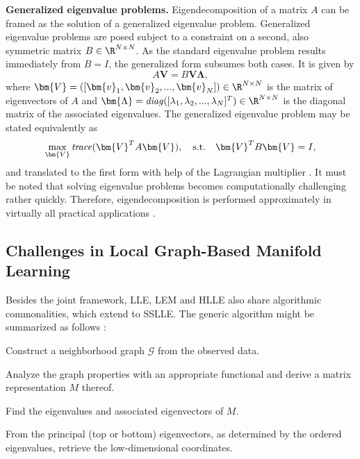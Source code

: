 \textbf{Generalized eigenvalue problems.} Eigendecomposition of a matrix $A$ can 
be framed as the solution of a generalized eigenvalue problem.
Generalized eigenvalue problems are posed subject to a constraint on a second, 
also symmetric matrix $B \in \R^{N \times N}$.
As the standard eigenvalue problem results immediately from $B = I$, the 
generalized form subsumes both cases.
It is given by $$A \bm{V} = B \bm{V} \bm{\Lambda},$$ where 
$\bm{V} = ([\bm{v}_1, \bm{v}_2, ..., \bm{v}_N]) \in \R^{N \times N}$ 
is the matrix of eigenvectors of $A$ and 
$\bm{\Lambda} = \text{\textit{diag}}([\lambda_1, \lambda_2, ..., \lambda_N]^T) 
\in \R^{N \times N}$ is the diagonal matrix of the associated eigenvalues.
The generalized eigenvalue problem may be stated equivalently as 
$$\max_{\bm{V}} \text{\textit{trace}}(\bm{V}^T A \bm{V}), \quad \text{s.t.} 
\quad \bm{V}^T B \bm{V} = I,$$ and translated to the first form with help of the 
Lagrangian multiplier \citep{ghojoghetal2019}.
It must be noted that solving eigenvalue problems becomes computationally 
challenging rather quickly.
Therefore, eigendecomposition is performed approximately in virtually all 
practical applications \citep{boermmehl2012}.


\subsection{Challenges in Local Graph-Based Manifold Learning}
\label{challenges}

Besides the joint framework, LLE, LEM and HLLE also share algorithmic 
commonalities, which extend to SSLLE.
The generic algorithm might be summarized as follows \citep{bengioetal2003}:

\begin{tight_enumerate}
  \item Construct a neighborhood graph $\mathcal{G}$ from the observed data.
  \item Analyze the graph properties with an appropriate functional and derive 
  a matrix representation $M$ thereof.
  \item Find the eigenvalues and associated eigenvectors of $M$.
  \item From the principal (top or bottom) eigenvectors, as determined by the 
  ordered eigenvalues, retrieve the low-dimensional coordinates.
\end{tight_enumerate}

